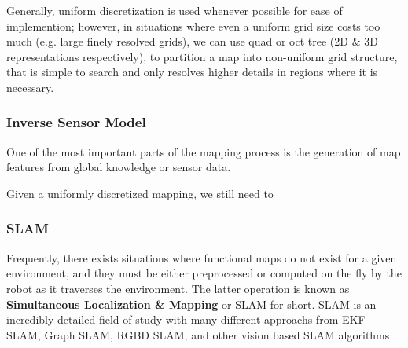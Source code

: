 \documentclass[journal]{IEEEtran}
\begin{document}
Generally, uniform discretization is used whenever possible for ease of implemention; however, in situations where even a uniform grid size costs too much (e.g. large finely resolved grids), we can use quad or oct tree (2D \& 3D representations respectively), to partition a map into non-uniform grid structure, that is simple to search and only resolves higher details in regions where it is necessary. \\

\subsubsection{Inverse Sensor Model}

One of the most important parts of the mapping process is the generation of map features from global knowledge or sensor data. 

Given a uniformly discretized mapping, we still need to 



\subsubsection{SLAM}
Frequently, there exists situations where functional maps do not exist for a given environment, and they must be either preprocessed or computed on the fly by the robot as it traverses the environment. The latter operation is known as \textbf{Simultaneous Localization \& Mapping} or SLAM for short. SLAM is an incredibly detailed field of study with many different approachs from EKF SLAM, Graph SLAM, RGBD SLAM, and other vision based SLAM algorithms\\
\end{document}
